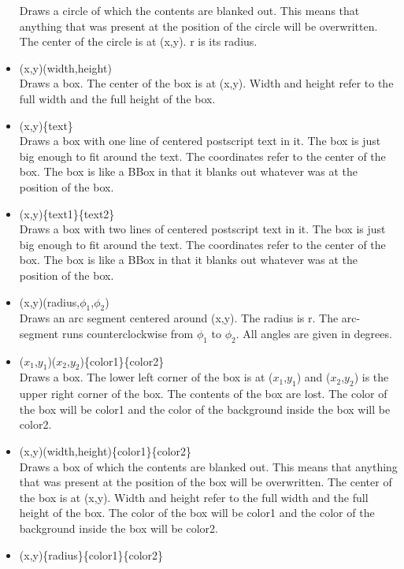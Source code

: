 \begin{itemize}
    Draws a circle of which the contents are blanked out. This means that 
    anything that was present at the position of the circle will be 
    overwritten. The center of the circle is at (x,y). r is its radius.
\item {}(x,y)(width,height) \hfill \\
    Draws a box. The center of the box is at (x,y). Width and height refer 
    to the full width and the full height of the box.
\item {}(x,y)\{text\} \hfill \\
    Draws a box with one line of centered postscript text in it. The box is 
    just big enough to fit around the text. The coordinates refer to the 
    center of the box. The box is like a BBox in that it blanks out 
    whatever was at the position of the box.
\item {}(x,y)\{text1\}\{text2\} \hfill \\
    Draws a box with two lines of centered postscript text in it. The box is 
    just big enough to fit around the text. The coordinates refer to the 
    center of the box. The box is like a BBox in that it blanks out 
    whatever was at the position of the box.
\item {}(x,y)(radius,$\phi_1$,$\phi_2$) \hfill \\
    Draws an arc segment centered around (x,y). The radius is r. The 
    arc-segment runs counterclockwise from $\phi_1$ to $\phi_2$. All 
    angles are given in degrees.
\item {}($x_1$,$y_1$)($x_2$,$y_2$)\{color1\}\{color2\} \hfill \\
    Draws a box. The lower left corner of the box is at ($x_1$,$y_1$) and 
    ($x_2$,$y_2$) is the upper right corner of the box. The contents of 
    the box are lost. The color of the box will be color1 and the color of 
    the background inside the box will be color2.
\item {}(x,y)(width,height)\{color1\}\{color2\} \hfill \\
    Draws a box of which the contents are blanked out. This means that 
    anything that was present at the position of the box will be 
    overwritten. The center of the box is at (x,y). Width and height refer 
    to the full width and the full height of the box. The color of the box 
    will be color1 and the color of the background inside the box will be 
    color2.
\item {}(x,y)\{radius\}\{color1\}\{color2\} \hfill \\

\end{itemize}
